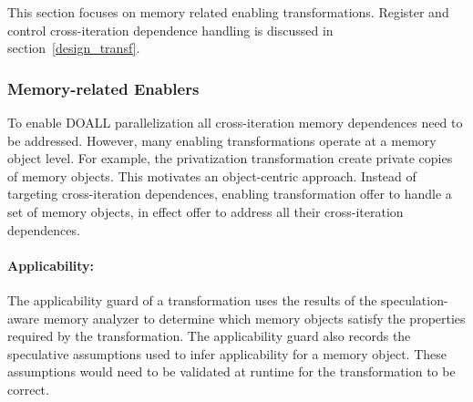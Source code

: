 %
This section focuses on memory related enabling transformations.
Register and control cross-iteration dependence handling is discussed
in section~\ref{design_transf}.

\subsubsection*{Memory-related Enablers}

To enable DOALL parallelization all cross-iteration memory dependences
need to be addressed.  However, many enabling transformations operate
at a memory object level. For example, the privatization
transformation create private copies of memory objects. This motivates
an object-centric approach.  Instead of targeting cross-iteration
dependences, enabling transformation offer to handle a set of memory
objects, in effect offer to address all their cross-iteration
dependences.

%
%
%


%
\paragraph{Applicability:}
%
The applicability guard of a transformation uses the results of the
speculation-aware memory analyzer to determine which memory objects
satisfy the properties required by the transformation.
%
The applicability guard also records the speculative assumptions used
to infer applicability for a memory object. These assumptions would
need to be validated at runtime for the transformation to be correct.

